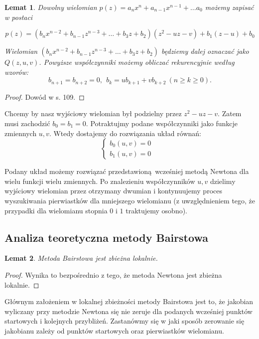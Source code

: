 \documentclass{article}
\newtheorem{lemat}{Lemat}
\begin{document}
\begin{lemat}
Dowolny wielomian $p(z) = a_nx^n  + a_{n-1}x^{n-1} + \ldots a_0$ możemy zapisać w postaci 

$$p(z) = \left(b_nx^{n-2} + b_{n-1}z^{n-3} + \ldots + b_3 z + b_2 \right) \left( z^2 - uz - v \right) + b_1(z-u) + b_0 $$	

Wielomian $ \left(b_nx^{n-2} + b_{n-1}z^{n-3} + \ldots + b_3 z + b_2 \right) $ będziemy dalej oznaczać jako $Q(z, u, v)$.
Powyższe współczynniki możemy obliczać rekurencyjnie według wzorów:
$$b_{n+1} = b_{n+2} = 0, \ \ b_k = ub_{k+1} + vb_{k+2} \ (n \geq k \geq 0).$$

\end{lemat}

\begin{proof}
Dowód w \cite{kincaid} s. 109.	
\end{proof}

Chcemy by nasz wyjściowy wielomian był podzielny przez $z^2 - uz - v$. Zatem musi zachodzić $b_0 = b_1 = 0$. Potraktujmy podane współczynniki jako funkcje zmiennych $u,v$. Wtedy dostajemy do rozwiązania układ równań:
$$
\left\{\begin{matrix}
b_0(u,v) = 0 & \\ 
b_1(u,v) = 0 & 
\end{matrix}\right.
$$

Podany układ możemy rozwiązać przedstawioną wcześniej metodą Newtona dla wielu funkcji wielu zmiennych. Po znalezieniu współczynników $u, v$ dzielimy wyjściowy wielomian przez otrzymany dwumian i kontynuujemy proces wyszukiwania pierwiastków dla mniejszego wielomianu (z uwzględnieniem tego, że przypadki dla wielomianu stopnia $0$ i $1$ traktujemy osobno).

\subsection{Analiza teoretyczna metody Bairstowa}

\begin{lemat}
Metoda Bairstowa jest zbieżna lokalnie.	
\end{lemat}

\begin{proof}
Wynika to bezpośrednio z tego, że metoda Newtona jest zbieżna lokalnie.	
\end{proof}

Głównym założeniem w lokalnej zbieżności metody Bairstowa jest to, że jakobian wyliczany przy metodzie Newtona się nie zeruje dla podanych wcześniej punktów startowych i kolejnych przybliżeń. Zastanówmy się w jaki sposób zerowanie się jakobianu zależy od punktów startowych oraz pierwiastków wielomianu.
\end{document}

